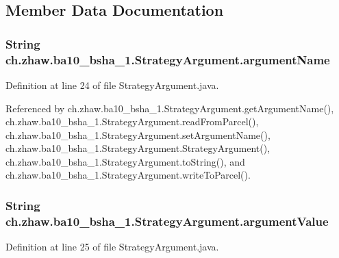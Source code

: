 \subsection{Member Data Documentation}
\hypertarget{classch_1_1zhaw_1_1ba10__bsha__1_1_1StrategyArgument_a23bc0d9bfc4863330365b5d5acf3bb75}{
\subsubsection[{argumentName}]{\setlength{\rightskip}{0pt plus 5cm}String {\bf ch.zhaw.ba10\_\-bsha\_\-1.StrategyArgument.argumentName}}}
\label{classch_1_1zhaw_1_1ba10__bsha__1_1_1StrategyArgument_a23bc0d9bfc4863330365b5d5acf3bb75}


Definition at line 24 of file StrategyArgument.java.

Referenced by ch.zhaw.ba10\_\-bsha\_\-1.StrategyArgument.getArgumentName(), ch.zhaw.ba10\_\-bsha\_\-1.StrategyArgument.readFromParcel(), ch.zhaw.ba10\_\-bsha\_\-1.StrategyArgument.setArgumentName(), ch.zhaw.ba10\_\-bsha\_\-1.StrategyArgument.StrategyArgument(), ch.zhaw.ba10\_\-bsha\_\-1.StrategyArgument.toString(), and ch.zhaw.ba10\_\-bsha\_\-1.StrategyArgument.writeToParcel().\hypertarget{classch_1_1zhaw_1_1ba10__bsha__1_1_1StrategyArgument_aaa81438d1961c79ddfa16915aa9cf5ff}{
\subsubsection[{argumentValue}]{\setlength{\rightskip}{0pt plus 5cm}String {\bf ch.zhaw.ba10\_\-bsha\_\-1.StrategyArgument.argumentValue}}}
\label{classch_1_1zhaw_1_1ba10__bsha__1_1_1StrategyArgument_aaa81438d1961c79ddfa16915aa9cf5ff}


Definition at line 25 of file StrategyArgument.java.

